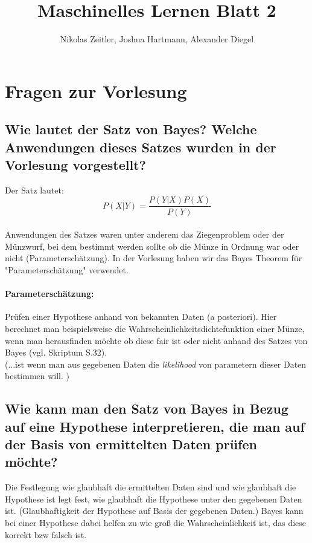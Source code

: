 \documentclass{scrartcl}
\author{Nikolas Zeitler, Joshua Hartmann, Alexander Diegel}
\title{Maschinelles Lernen Blatt 2}
\begin{document}
\maketitle 
\section{Fragen zur Vorlesung}
\subsection{Wie lautet der Satz von Bayes? Welche Anwendungen dieses Satzes wurden in der Vorlesung vorgestellt?}
Der Satz lautet: \[P(X|Y) = \frac{P(Y|X)P(X)}{P(Y)} \] \\
Anwendungen des Satzes waren unter anderem das Ziegenproblem oder der Münzwurf, bei dem bestimmt werden sollte ob die Münze in Ordnung war oder nicht (Parameterschätzung).
In der Vorlesung haben wir das Bayes Theorem für "Parameterschätzung" verwendet. \\
\paragraph{Parameterschätzung:} Prüfen einer Hypothese anhand von bekannten Daten (a posteriori). Hier berechnet man beispielsweise die Wahrscheinlichkeitsdichtefunktion einer Münze, wenn man herausfinden möchte ob diese fair ist oder nicht anhand des Satzes von Bayes (vgl. Skriptum S.32).
\\(...ist wenn man aus gegebenen Daten die \textit{likelihood} von parametern dieser Daten bestimmen will. )

\subsection{Wie kann man den Satz von Bayes in Bezug auf eine Hypothese interpretieren, die man auf der Basis von ermittelten Daten prüfen möchte?}
Die Festlegung wie glaubhaft die ermittelten Daten sind und wie glaubhaft die Hypothese ist legt fest, wie glaubhaft die Hypothese unter den gegebenen Daten ist. (Glaubhaftigkeit der Hypothese auf Basis der gegebenen Daten.)
Bayes kann bei einer Hypothese dabei helfen zu wie groß die Wahrscheinlichkeit ist, das diese korrekt bzw falsch ist. 
\end{document}
